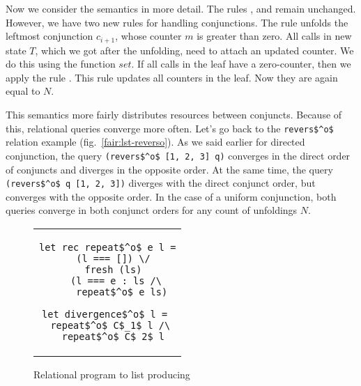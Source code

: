 Now we consider the semantics in more detail. The rules ,  and  remain unchanged. However, we have two new rules for handling conjunctions. The  rule unfolds the leftmost conjunction $c_{i + 1}$, whose counter $m$ is greater than zero. All calls in new state $T$, which we got after the unfolding, need to attach an updated counter. We do this using the function $set$. If all calls in the leaf have a zero-counter, then we apply the rule . This rule updates all counters in the leaf. Now they are again equal to $N$.

This semantics more fairly distributes resources between conjuncts. Because of this, relational queries converge more often. Let's go back to the \lstinline{revers$^o$} relation example (fig.~\ref{fair:lst-reverso}). As we said earlier for directed conjunction, the query \lstinline{(revers$^o$ [1, 2, 3] q)} converges in the direct order of conjuncts and diverges in the opposite order. At the same time, the query \lstinline{(revers$^o$ q [1, 2, 3])} diverges with the direct conjunct order, but converges with the opposite order. In the case of a uniform conjunction, both queries converge in both conjunct orders for any count of unfoldings $N$. 

\begin{figure}[h!]
\centering
\begin{tabular}{c}
\begin{lstlisting}
let rec repeat$^o$ e l =
  (l === []) \/
  fresh (ls)
    (l === e : ls /\ 
     repeat$^o$ e ls)
     
let divergence$^o$ l = 
  repeat$^o$ C$_1$ l /\ 
  repeat$^o$ C$_2$ l
\end{lstlisting}
\end{tabular}

\caption{Relational program to list producing}
\label{fair:lst-repeato}
\end{figure}

